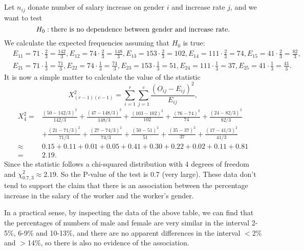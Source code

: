 \documentclass[11pt,a4paper]{article}
\begin{document}
\subsection{}
Let $n_{ij}$ donate number of salary increase on gender $i$ and increase rate $j$, and we want to test
$$H_0:{\rm there\ is\ no\ dependence\ between\ gender\ and\ increase\ rate }.$$
We calculate the expected frequencies assuming that $H_0$ is true:
\begin{align*}
&E_{11}=71\cdot\frac{2}{3}=\frac{142}{3},E_{12}=74\cdot\frac{2}{3}=\frac{148}{3},E_{13}=153\cdot\frac{2}{3}=102,E_{14}=111\cdot\frac{2}{3}=74,E_{15}=41\cdot\frac{2}{3}=\frac{82}{3},\\
&E_{21}=71\cdot\frac{1}{3}=\frac{71}{3},E_{22}=74\cdot\frac{1}{3}=\frac{74}{3},E_{23}=153\cdot\frac{1}{3}=51,E_{24}=111\cdot\frac{1}{3}=37,E_{25}=41\cdot\frac{1}{3}=\frac{41}{3}.
\end{align*}
It is now a simple matter to calculate the value of the statistic
$$X^2_{(r-1)(c-1)}=\sum_{i=1}^r\sum_{j=1}^c\frac{(O_{ij}-E_{ij})^2}{E_{ij}},$$
\begin{align*}
X_4^2=&\frac{(50-142/3)^2}{142/3}+\frac{(47-148/3)^2}{148/3}+\frac{(103-102)^2}{102}+\frac{(76-74)^2}{74}+\frac{(24-82/3)^2}{82/3}\\
&+\frac{(21-71/3)^2}{71/3}+\frac{(27-74/3)^2}{74/3}+\frac{(50-51)^2}{51}+\frac{(35-37)^2}{37}+\frac{(17-41/3)^2}{41/3}\\
\approx &0.15+0.11+0.01+0.05+0.41+0.30+0.22+0.02+0.11+0.81\\
=&2.19.
\end{align*}
Since the statistic follows a chi-squared distribution with 4 degrees of
freedom and $\chi^2_{0.7,3}\approx2.19$. So the P-value of the test is 0.7 (very large). These data don't tend to support the claim that there is an association between the percentage increase in the
salary of the worker and the worker’s gender. \medskip

In a practical sense, by inspecting the data of the above table, we can find that the percentages of numbers of male and female are very similar in the interval 2-5\%, 6-9\% and 10-13\%, and there are no apparent differences in the interval $<$2\% and $>$14\%, so there is also no evidence of the association.
\end{document}

